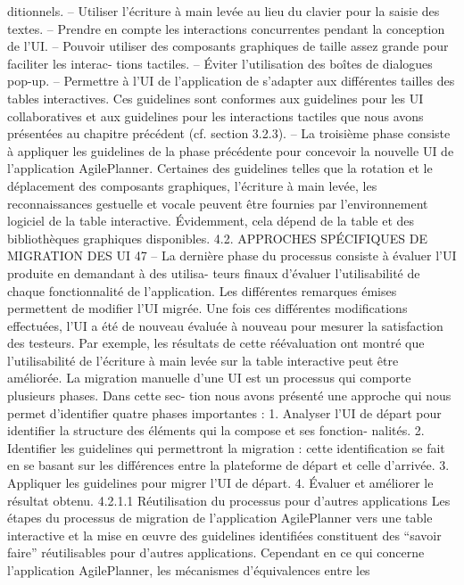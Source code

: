 \documentclass{article}
\begin{document}
ditionnels.
– Utiliser l’écriture à main levée au lieu du clavier pour la saisie des textes.
– Prendre en compte les interactions concurrentes pendant la conception de l’UI.
– Pouvoir utiliser des composants graphiques de taille assez grande pour faciliter les interac-
tions tactiles.
– Éviter l’utilisation des boîtes de dialogues pop-up.
– Permettre à l’UI de l’application de s’adapter aux différentes tailles des tables interactives.
Ces guidelines sont conformes aux guidelines pour les UI collaboratives et aux guidelines pour
les interactions tactiles que nous avons présentées au chapitre précédent (cf. section 3.2.3).
– La troisième phase consiste à appliquer les guidelines de la phase précédente pour concevoir la
nouvelle UI de l’application AgilePlanner. Certaines des guidelines telles que la rotation et le
déplacement des composants graphiques, l’écriture à main levée, les reconnaissances gestuelle
et vocale peuvent être fournies par l’environnement logiciel de la table interactive. Évidemment,
cela dépend de la table et des bibliothèques graphiques disponibles.
4.2. APPROCHES SPÉCIFIQUES DE MIGRATION DES UI
47
– La dernière phase du processus consiste à évaluer l’UI produite en demandant à des utilisa-
teurs ﬁnaux d’évaluer l’utilisabilité de chaque fonctionnalité de l’application. Les différentes
remarques émises permettent de modiﬁer l’UI migrée. Une fois ces différentes modiﬁcations
effectuées, l’UI a été de nouveau évaluée à nouveau pour mesurer la satisfaction des testeurs.
Par exemple, les résultats de cette réévaluation ont montré que l’utilisabilité de l’écriture à main
levée sur la table interactive peut être améliorée.
La migration manuelle d’une UI est un processus qui comporte plusieurs phases. Dans cette sec-
tion nous avons présenté une approche qui nous permet d’identiﬁer quatre phases importantes :
1. Analyser l’UI de départ pour identiﬁer la structure des éléments qui la compose et ses fonction-
nalités.
2. Identiﬁer les guidelines qui permettront la migration : cette identiﬁcation se fait en se basant sur
les différences entre la plateforme de départ et celle d’arrivée.
3. Appliquer les guidelines pour migrer l’UI de départ.
4. Évaluer et améliorer le résultat obtenu.
4.2.1.1
Réutilisation du processus pour d’autres applications
Les étapes du processus de migration de l’application AgilePlanner vers une table interactive et
la mise en œuvre des guidelines identiﬁées constituent des “savoir faire” réutilisables pour d’autres
applications.
Cependant en ce qui concerne l’application AgilePlanner, les mécanismes d’équivalences entre les
\end{document}
